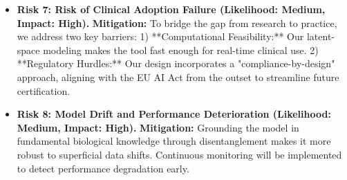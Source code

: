 \documentclass[11pt, a4paper]{article}
\begin{document}
\begin{itemize}
    \item \textbf{Risk 7: Risk of Clinical Adoption Failure (Likelihood: Medium, Impact: High).}
    \subitem \textbf{Mitigation:} To bridge the gap from research to practice, we address two key barriers: 1) **Computational Feasibility:** Our latent-space modeling makes the tool fast enough for real-time clinical use. 2) **Regulatory Hurdles:** Our design incorporates a "compliance-by-design" approach, aligning with the EU AI Act from the outset to streamline future certification.
    \item \textbf{Risk 8: Model Drift and Performance Deterioration (Likelihood: Medium, Impact: High).}
    \subitem \textbf{Mitigation:} Grounding the model in fundamental biological knowledge through disentanglement makes it more robust to superficial data shifts. Continuous monitoring will be implemented to detect performance degradation early.
\end{itemize}
\end{document}
